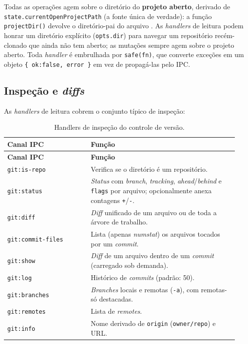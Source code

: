 Todas as operações agem sobre o diretório do \textbf{projeto aberto}, derivado
de \lstinline|state.currentOpenProjectPath| (a fonte única de verdade): a função
\lstinline|projectDir()| devolve o diretório-pai do arquivo . As
\textit{handlers} de leitura podem honrar um diretório explícito
(\lstinline|opts.dir|) para navegar um repositório recém-clonado que ainda não
tem  aberto; as mutações sempre agem sobre o projeto aberto. Toda
\textit{handler} é embrulhada por \lstinline|safe(fn)|, que converte exceções em
um objeto \lstinline|{ ok:false, error }| em vez de propagá-las pelo IPC.

\subsection{Inspeção e \textit{diffs}}

As \textit{handlers} de leitura cobrem o conjunto típico de inspeção:

\begin{longtable}{>{\raggedright\arraybackslash}p{0.34\linewidth} >{\raggedright\arraybackslash}p{0.6\linewidth}}
\caption{Handlers de inspeção do controle de versão.}\label{tab:13-git-read}\\
\toprule
\textbf{Canal IPC} & \textbf{Função} \\
\midrule
\endfirsthead
\toprule
\textbf{Canal IPC} & \textbf{Função} \\
\midrule
\endhead
\lstinline|git:is-repo|      & Verifica se o diretório é um repositório. \\
\lstinline|git:status|       & \textit{Status} com \textit{branch}, \textit{tracking}, \textit{ahead}/\textit{behind} e \texttt{flags} por arquivo; opcionalmente anexa contagens \texttt{+}/\texttt{-}. \\
\lstinline|git:diff|         & \textit{Diff} unificado de um arquivo ou de toda a árvore de trabalho. \\
\lstinline|git:commit-files| & Lista (apenas \textit{numstat}) os arquivos tocados por um \textit{commit}. \\
\lstinline|git:show|         & \textit{Diff} de um arquivo dentro de um \textit{commit} (carregado sob demanda). \\
\lstinline|git:log|          & Histórico de \textit{commits} (padrão: 50). \\
\lstinline|git:branches|     & \textit{Branches} locais e remotas (\lstinline|-a|), com remotas-só destacadas. \\
\lstinline|git:remotes|      & Lista de \textit{remotes}. \\
\lstinline|git:info|         & Nome derivado de \lstinline|origin| (\lstinline|owner/repo|) e URL. \\
\bottomrule
\end{longtable}

